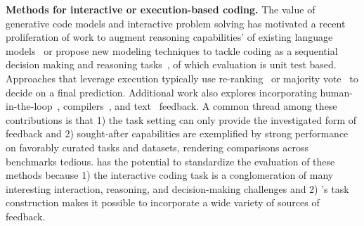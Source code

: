\textbf{Methods for interactive or execution-based coding.} The value of generative code models and interactive problem solving has motivated a recent proliferation of work to augment reasoning capabilities' of existing language models~\cite{yao2023react, shinn2023reflexion, wang2023planandsolve, yao2023tree, zhang2023planning, chen2023teaching} or propose new modeling techniques to tackle coding as a sequential decision making and reasoning tasks~\cite{bunel2018leveraging, Chen2018ExecutionGuidedNP, ellis2019write, alphacode, chen2022codet, le2022coderl}, of which evaluation is unit test based.
Approaches that leverage execution typically use re-ranking~\cite{zhang2022coder, ni2023lever, yin-neubig-2019-reranking, zeng2022nbest} or majority vote~\cite{Chen2018ExecutionGuidedNP, alphacode, shi2022natural} to decide on a final prediction.
Additional work also explores incorporating human-in-the-loop~\cite{chen2023improving, lahiri2022interactive}, compilers~\cite{wang2022compilable}, and text~\cite{wang2023leti,zhang2023selfedit} feedback.
A common thread among these contributions is that 1) the task setting can only provide the investigated form of feedback and 2) sought-after capabilities are exemplified by strong performance on favorably curated tasks and datasets, rendering comparisons across benchmarks tedious.
\benchmark{} has the potential to standardize the evaluation of these methods because 1) the interactive coding task is a conglomeration of many interesting interaction, reasoning, and decision-making challenges and 2) \benchmark{}'s task construction makes it possible to incorporate a wide variety of sources of feedback.






